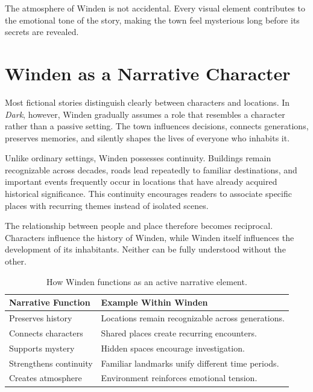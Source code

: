 \documentclass[12pt,oneside,openany]{book}
\begin{document}
\begin{tcolorbox}[colback=blue!5,colframe=blue!60!black,title=Analysis]
The atmosphere of Winden is not accidental. Every visual element contributes
to the emotional tone of the story, making the town feel mysterious long
before its secrets are revealed.
\end{tcolorbox}
\section{Winden as a Narrative Character}

Most fictional stories distinguish clearly between characters and locations.
In \textit{Dark}, however, Winden gradually assumes a role that resembles a
character rather than a passive setting. The town influences decisions,
connects generations, preserves memories, and silently shapes the lives of
everyone who inhabits it.

Unlike ordinary settings, Winden possesses continuity. Buildings remain
recognizable across decades, roads lead repeatedly to familiar destinations,
and important events frequently occur in locations that have already acquired
historical significance. This continuity encourages readers to associate
specific places with recurring themes instead of isolated scenes.

The relationship between people and place therefore becomes reciprocal.
Characters influence the history of Winden, while Winden itself influences the
development of its inhabitants. Neither can be fully understood without the
other.

\begin{table}[H]
\centering
\begin{tabular}{|p{4cm}|p{8cm}|}
\hline
\textbf{Narrative Function} & \textbf{Example Within Winden}\\
\hline
Preserves history & Locations remain recognizable across generations.\\
\hline
Connects characters & Shared places create recurring encounters.\\
\hline
Supports mystery & Hidden spaces encourage investigation.\\
\hline
Strengthens continuity & Familiar landmarks unify different time periods.\\
\hline
Creates atmosphere & Environment reinforces emotional tension.\\
\hline
\end{tabular}
\caption{How Winden functions as an active narrative element.}
\end{table}
\end{document}
